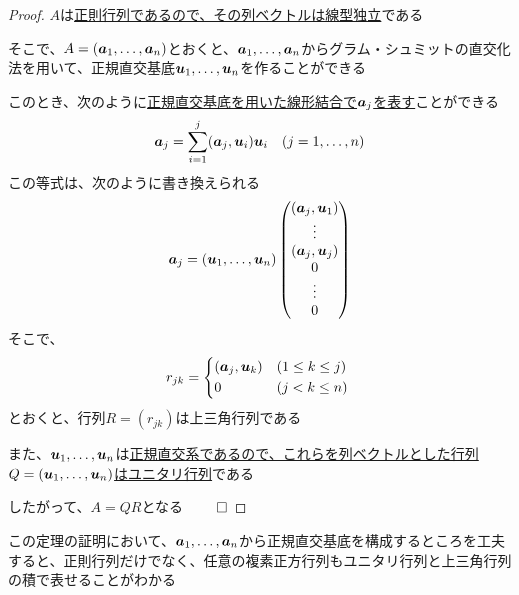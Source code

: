 \documentclass[../../../topic_linear-algebra]{subfiles}
\begin{document}
\begin{proof}
  $A$は\hyperref[thm:invertible-iff-col-indep]{正則行列であるので、その列ベクトルは線型独立}である

  そこで、$A = (\vb*{a}_1,\ldots,\vb*{a}_n)$とおくと、$\vb*{a}_1,\ldots,\vb*{a}_n$からグラム・シュミットの直交化法を用いて、正規直交基底$\vb*{u}_1,\ldots,\vb*{u}_n$を作ることができる

  \br

  このとき、次のように\hyperref[thm:expansion-in-orthonormal-basis]{正規直交基底を用いた線形結合で$\vb*{a}_j$を表す}ことができる
  \begin{equation*}
    \vb*{a}_j = \sum_{i=1}^j (\vb*{a}_j, \vb*{u}_i) \vb*{u}_i \quad (j = 1,\ldots,n)
  \end{equation*}
  この等式は、次のように書き換えられる
  \begin{equation*}
    \vb*{a}_j = (\vb*{u}_1,\ldots,\vb*{u}_n) \begin{pmatrix}
      (\vb*{a}_j, \vb*{u}_1) \\
      \vdots                 \\
      (\vb*{a}_j, \vb*{u}_j) \\
      0                      \\
      \vdots                 \\
      0
    \end{pmatrix}
  \end{equation*}
  そこで、
  \begin{equation*}
    r_{jk} = \begin{cases*}
      (\vb*{a}_j, \vb*{u}_k) & ($1 \leq k \leq j$) \\
      0                      & ($j < k \leq n$)
    \end{cases*}
  \end{equation*}
  とおくと、行列$R = (r_{jk})$は上三角行列である

  \br

  また、$\vb*{u}_1,\ldots,\vb*{u}_n$は\hyperref[thm:unitary-iff-columns-orthonormal]{正規直交系であるので、これらを列ベクトルとした行列$Q = (\vb*{u}_1,\ldots,\vb*{u}_n)$はユニタリ行列}である

  \br

  したがって、$A = QR$となる $\qed$
\end{proof}

\br

この定理の証明において、$\vb*{a}_1,\ldots,\vb*{a}_n$から正規直交基底を構成するところを工夫すると、正則行列だけでなく、任意の複素正方行列もユニタリ行列と上三角行列の積で表せることがわかる
\end{document}
